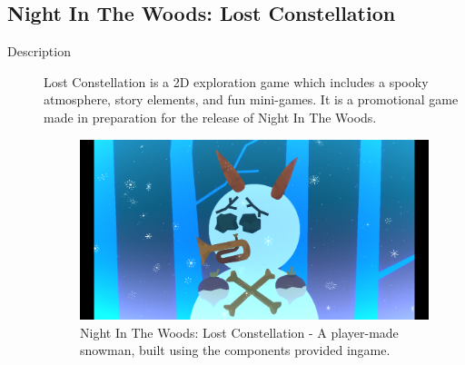 \clearpage
\subsection{Night In The Woods: Lost Constellation}
\begin{description}
\item[Description]{Lost Constellation is a 2D exploration game which includes a spooky atmosphere, story elements, and fun mini-games. It is a promotional game made in preparation for the release of Night In The Woods.

\begin{figure}[htb]
	\centering\includegraphics[width=.25\linewidth]{images/game_nitw}
	\caption{Night In The Woods: Lost Constellation - A player-made snowman, built using the components provided ingame.}
	\label{fig:nitw}
\end{figure}}


\end{description}
